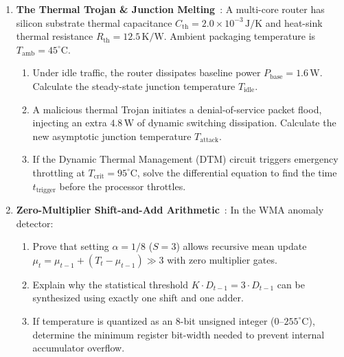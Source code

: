 \begin{enumerate}
    \item \textbf{The Thermal Trojan \& Junction Melting}~\cite{Hasanzadeh2026Heat}: A multi-core router has silicon substrate thermal capacitance $C_{\mathrm{th}} = 2.0 \times 10^{-3}\,\mathrm{J/K}$ and heat-sink thermal resistance $R_{\mathrm{th}} = 12.5\,\mathrm{K/W}$. Ambient packaging temperature is $T_{\mathrm{amb}} = 45^\circ\mathrm{C}$.
    \begin{enumerate}
        \item Under idle traffic, the router dissipates baseline power $P_{\mathrm{base}} = 1.6\,\mathrm{W}$. Calculate the steady-state junction temperature $T_{\mathrm{idle}}$.
        \item A malicious thermal Trojan initiates a denial-of-service packet flood, injecting an extra $4.8\,\mathrm{W}$ of dynamic switching dissipation. Calculate the new asymptotic junction temperature $T_{\mathrm{attack}}$.
        \item If the Dynamic Thermal Management (DTM) circuit triggers emergency throttling at $T_{\mathrm{crit}} = 95^\circ\mathrm{C}$, solve the differential equation to find the time $t_{\mathrm{trigger}}$ before the processor throttles.
    \end{enumerate}

    \item \textbf{Zero-Multiplier Shift-and-Add Arithmetic}~\cite{Hasanzadeh2026Heat}: In the WMA anomaly detector:
    \begin{enumerate}
        \item Prove that setting $\alpha = 1/8$ ($S = 3$) allows recursive mean update $\mu_t = \mu_{t-1} + (T_t - \mu_{t-1}) \gg 3$ with zero multiplier gates.
        \item Explain why the statistical threshold $K \cdot D_{t-1} = 3 \cdot D_{t-1}$ can be synthesized using exactly one shift and one adder.
        \item If temperature is quantized as an 8-bit unsigned integer ($0\text{--}255^\circ\mathrm{C}$), determine the minimum register bit-width needed to prevent internal accumulator overflow.
    \end{enumerate}


\end{enumerate}
